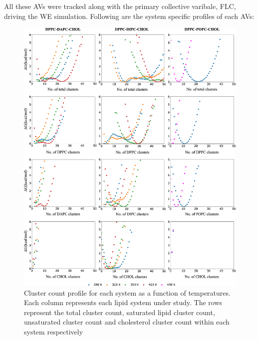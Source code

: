 \documentclass[10pt]{article}
\begin{document}
All these AVs were tracked along with the primary collective varibale, FLC, driving the WE simulation.
Following are the system specific profiles of each AVs: 

\begin{figure}[H]
    \centering
    \includegraphics[width=6.5in]{Figures/Supplementary/AVs/ClusterCount/placeholder.jpg}
    \caption{Cluster count profile for each system as a function of temperatures. Each column represents each lipid system under study. The rows represent the total cluster count, saturated lipid cluster count, unsaturated cluster count and cholesterol cluster count within each system respectively}
    \label{figs2:view}
\end{figure}
\end{document}
